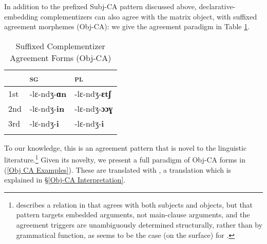 \documentclass[output=paper,newtxmath,modfonts,nonflat,hidelinks]{langsci/langscibook}
\begin{document}
In addition to the prefixed Subj-CA pattern discussed above,  declarative-embedding complementizers can also agree with the matrix object, with suffixed agreement morphemes (Obj-CA): we give the agreement paradigm in Table \ref{Obj CA Forms Table}. 


\begin{table}[H]
\caption{Suffixed Complementizer Agreement Forms (Obj-CA)}
\label{Obj CA Forms Table}
 \begin{tabular}{lll} 
  \lsptoprule
   {} & \textsc{\textsc{sg}} & \textsc{pl} \\ 
  \midrule
    {1st} & -lɛ-ndʒ-\textbf{ɑn} & -lɛ-ndʒ-\textbf{ɛtʃ} \\
    {2nd} & -lɛ-ndʒ-\textbf{in} & -lɛ-ndʒ-\textbf{ɔɔɣ} \\
    {3rd} & -lɛ-ndʒ-\textbf{i} & -lɛ-ndʒ-\textbf{i} \\
  \lspbottomrule
 \end{tabular}
\end{table}

\noindent To our knowledge, this is an agreement pattern that is novel to the linguistic literature.\footnote{\citet{Deal:2015} describes a  relation in  that agrees with both subjects and objects, but that pattern targets embedded arguments, not main-clause arguments, and the agreement triggers are unambiguously determined structurally, rather than by grammatical function, as seems to be the case (on the surface) for .}  Given its novelty, we present a full paradigm of Obj-CA forms in (\ref{Obj CA Examples}). These are translated with , a translation which is explained in \S \ref{Obj-CA Interpretation}. 
\end{document}
